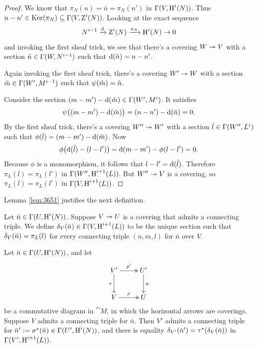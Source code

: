 \begin{proof}
We know that $\pi_N(n) = \bar{n} = \pi_N(n')$ in $\Gamma(V, \operatorname{H}^{i}(N))$. 
Thus 
$n - n' \in \operatorname{Ker}(\pi_N) \subseteq \Gamma(V, \operatorname{Z}^{i}(N))$.
Looking at the  exact sequence 
\[ N^{i - 1} \xrightarrow{\mathrm{d}} \operatorname{Z}^{i}(N) \xrightarrow{\pi_N} \operatorname{H}^{i}(N) \to 0 \]
and invoking the first sheaf trick, we see that there's a covering 
$W \twoheadrightarrow V$ with a section $\tilde{n} \in \Gamma(W, N^{i - 1})$
such that $\mathrm{d}(\tilde{n}) = n - n'$. 

Again invoking the first sheaf trick, there's a covering 
$W' \twoheadrightarrow W$ with a section $\tilde{m} \in \Gamma(W', M^{i - 1})$
such that $\psi(\tilde{m}) = \tilde{n}$. 

Consider the section 
$(m - m') - \mathrm{d}(\tilde{m}) \in \Gamma(W', M^{i})$.
It satisfies 
\[ \psi \bigl( (m - m') - \mathrm{d}(\tilde{m}) \bigr) = 
(n - n') - \mathrm{d}(\tilde{n}) = 0 . \]
By the first sheaf trick, there's a covering 
$W'' \twoheadrightarrow W'$ with a section $\tilde{l} \in \Gamma(W'', L^{i})$
such that 
$\phi(\tilde{l}) = (m - m') - \mathrm{d}(\tilde{m})$.
Now 
\[ \phi \bigl( \mathrm{d}(\tilde{l}) - (l - l') \bigr) = 
\mathrm{d}(m - m') - \phi(l - l') = 0 . \]
Because $\phi$ is a monomorphism, it follows that 
$l - l' = \mathrm{d}(\tilde{l})$. 
Therefore $\pi_L(l) = \pi_L(l')$ in $\Gamma(W'', \operatorname{H}^{i + 1}(L))$. 
But $W'' \twoheadrightarrow V$ is a covering, so 
$\pi_L(l) = \pi_L(l')$ in $\Gamma(V, \operatorname{H}^{i + 1}(L))$. 
\end{proof}

Lemma \ref{lem:3651} justifies the next definition. 

\begin{dfn} \label{dfn:3650}
Let $\bar{n} \in \Gamma(U, \operatorname{H}^i(N))$. Suppose $V \twoheadrightarrow U$ is a covering 
that admits a connecting triple. We define 
$\delta_V(\bar{n}) \in \Gamma(V, \operatorname{H}^{i + 1}(L))$
to be the unique section such that 
$\delta_V(\bar{n}) = \pi_L(l)$ for every 
connecting triple $(n, m, l)$ for $\bar{n}$ over $V$.
\end{dfn}

\begin{lem} \label{lem:3640}
Let $\bar{n} \in \Gamma(U, \operatorname{H}^i(N))$, and let  
\[ \UseTips \xymatrix @C=6ex @R=6ex {
V'
\ar@{->>}[r]^{\rho'}
\ar[d]_{\tau}
&
U'
\ar[d]^{\si}
\\
V
\ar@{->>}[r]^{\rho}
&
U
} \]
be a commutative diagram in $\cat{M}$, in which the horizontal arrows are 
coverings. Suppose $V$ admits a connecting triple for $\bar{n}$.
Then $V'$ admits a connecting triple for 
$\bar{n}' := \sigma^*(\bar{n})\in \Gamma(U', \operatorname{H}^i(N))$,
and there is equality 
$\delta_{V'}(\bar{n}') = \tau^*(\delta_V(\bar{n}))$
in $\Gamma(V', \operatorname{H}^{i + 1}(L))$.
\end{lem}

